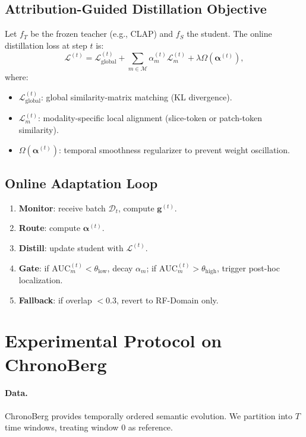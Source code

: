 \documentclass[11pt]{article}
\begin{document}
\subsection{Attribution-Guided Distillation Objective}

Let \(f_T\) be the frozen teacher (e.g., CLAP) and \(f_S\) the student. The online distillation loss at step \(t\) is:
\begin{equation}
    \mathcal{L}^{(t)} = \mathcal{L}_{\text{global}}^{(t)} + \sum_{m \in \mathcal{M}} \alpha_m^{(t)} \mathcal{L}_m^{(t)} + \lambda \Omega(\boldsymbol{\alpha}^{(t)}),
\end{equation}
where:
\begin{itemize}
    \item \(\mathcal{L}_{\text{global}}^{(t)}\): global similarity-matrix matching (KL divergence).
    \item \(\mathcal{L}_m^{(t)}\): modality-specific local alignment (slice-token or patch-token similarity).
    \item \(\Omega(\boldsymbol{\alpha}^{(t)})\): temporal smoothness regularizer to prevent weight oscillation.
\end{itemize}

\subsection{Online Adaptation Loop}
\begin{enumerate}
    \item \textbf{Monitor}: receive batch \(\mathcal{D}_t\), compute \(\mathbf{g}^{(t)}\).
    \item \textbf{Route}: compute \(\boldsymbol{\alpha}^{(t)}\).
    \item \textbf{Distill}: update student with \(\mathcal{L}^{(t)}\).
    \item \textbf{Gate}: if \(\text{AUC}_m^{(t)} < \theta_{\text{low}}\), decay \(\alpha_m\); if \(\text{AUC}_m^{(t)} > \theta_{\text{high}}\), trigger post-hoc localization.
    \item \textbf{Fallback}: if overlap \(< 0.3\), revert to RF-Domain only.
\end{enumerate}

\section{Experimental Protocol on ChronoBerg}
\label{sec:exp}

\paragraph{Data.} ChronoBerg provides temporally ordered semantic evolution. We partition into \(T\) time windows, treating window \(0\) as reference.
\end{document}
